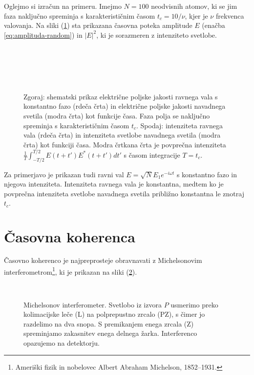 Oglejmo si izračun
na primeru. Imejmo $N=100$ neodvisnih atomov, ki se jim faza naključno
spreminja s karakterističnim časom $t_{c}=10/\nu$, kjer je $\nu$
frekvenca valovanja. Na sliki (\ref{fig:amplituda-intenziteta}) sta
prikazana časovna poteka amplitude $E$ (enačba \ref{eq:amplituda-random})
in $|E|^{2}$, ki je sorazmeren z intenziteto svetlobe.
\begin{figure}
\centering
\def\svgwidth{150truemm} 
\\
\def\svgwidth{150truemm} 
\\
\def\svgwidth{150truemm} 
\\
\def\svgwidth{150truemm} 
\\
\caption{Zgoraj: shematski prikaz električne poljske jakosti 
ravnega vala s konstantno fazo (rdeča črta) in električne
poljske jakosti navadnega svetila (modra črta) kot funkcije
časa. Faza polja se naključno spreminja s karakterističnim časom $t_{c}$.
Spodaj: intenziteta ravnega vala (rdeča črta) in intenziteta
svetlobe navadnega svetila (modra črta) kot funkciji
časa. Modra črtkana črta je povprečna intenziteta 
$\frac{1}{T}\int_{-T/2}^{T/2}E(t+t')E^{*}(t+t')dt'$
s časom integracije $T=t_{c}$. }
\label{fig:amplituda-intenziteta}
\end{figure}
Za primerjavo je prikazan tudi ravni val $E=\sqrt{N}E_{1}e^{-i\omega t}$
s konstantno fazo in njegova intenziteta. Intenziteta ravnega vala je konstantna, 
medtem ko je povprečna intenziteta svetlobe navadnega svetila približno 
konstantna le znotraj $t_{c}$.

\section{Časovna koherenca}
\label{sec:casovna-koherenca}

Časovno koherenco je najpreprosteje obravnavati 
z Michelsonovim 
interferometrom\footnote{Ameriški fizik in nobelovec Albert Abraham Michelson, 1852--1931.},
ki je prikazan na sliki (\ref{fig:michelson}). 
\begin{figure}[!h]
\centering
\def\svgwidth{85truemm} 
\\
\caption{\label{fig:michelson}Michelsonov interferometer. Svetlobo
iz izvora $P$ usmerimo preko kolimacijske leče (L) na polprepustno
zrcalo (PZ), s čimer jo razdelimo na dva snopa. S premikanjem 
enega zrcala (Z) spreminjamo zakasnitev enega delnega žarka. Interferenco opazujemo na detektorju.}
\end{figure}

